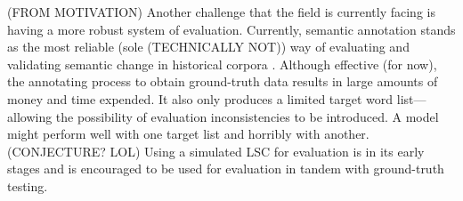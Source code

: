 (FROM MOTIVATION)
Another challenge that the field is currently facing is having a more robust system of evaluation. Currently, semantic annotation stands as the most reliable (sole (TECHNICALLY NOT)) way of evaluating and validating semantic change in historical corpora \citep{hengchen2021challenges}. Although effective (for now), the annotating process to obtain ground-truth data results in large amounts of money and time expended. It also only produces a limited target word list—allowing the possibility of evaluation inconsistencies to be introduced. A model might perform well with one target list and horribly with another. (CONJECTURE? LOL) Using a simulated LSC for evaluation is in its early stages and is encouraged to be used for evaluation in tandem with ground-truth testing.

